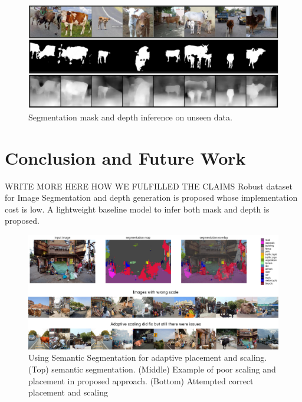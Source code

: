 \documentclass[review]{cvpr}
\begin{document}
\begin{figure}
  \begin{center}
    \includegraphics[width=1\textwidth]{unseeninference.png}
  \end{center}
  \caption{Segmentation mask and depth inference on unseen data.}
  \label{fig:unseeninfer}
\end{figure}

\section{Conclusion and Future Work}
WRITE MORE HERE HOW WE FULFILLED THE CLAIMS
Robust dataset for Image Segmentation and depth generation is proposed whose implementation cost is low.
A lightweight baseline model to infer both mask and depth is proposed.

\begin{figure}
  \begin{center}
  \includegraphics[width=1.0\textwidth]{refinement.png}
  \caption{Using Semantic Segmentation for adaptive placement and scaling. (Top) semantic segmentation. (Middle) Example of poor scaling and placement in proposed approach. (Bottom) Attempted correct placement and scaling}
  
  \end{center}
  \label{fig:refinement}
\end{figure}
\end{document}
